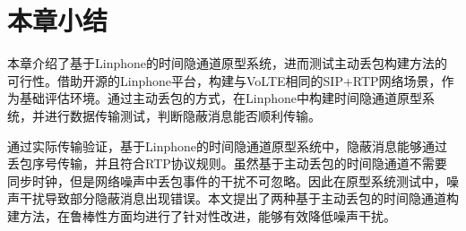 \section{本章小结}
\label{chap:linphone:conclude}

本章介绍了基于Linphone的时间隐通道原型系统，进而测试主动丢包构建方法的可行性。借助开源的Linphone平台，构建与VoLTE相同的SIP+RTP网络场景，作为基础评估环境。通过主动丢包的方式，在Linphone中构建时间隐通道原型系统，并进行数据传输测试，判断隐蔽消息能否顺利传输。

通过实际传输验证，基于Linphone的时间隐通道原型系统中，隐蔽消息能够通过丢包序号传输，并且符合RTP协议规则。虽然基于主动丢包的时间隐通道不需要同步时钟，但是网络噪声中丢包事件的干扰不可忽略。因此在原型系统测试中，噪声干扰导致部分隐蔽消息出现错误。本文提出了两种基于主动丢包的时间隐通道构建方法，在鲁棒性方面均进行了针对性改进，能够有效降低噪声干扰。